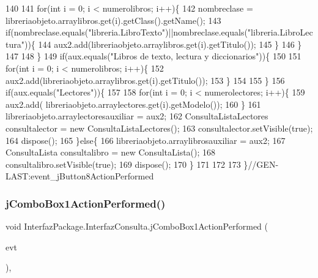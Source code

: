 \begin{DoxyCode}
140             
141             \textcolor{keywordflow}{for}(\textcolor{keywordtype}{int} i = 0; i < numerolibros; i++)\{
142                 nombreclase = libreriaobjeto.arraylibros.get(i).getClass().getName();
143                 \textcolor{keywordflow}{if}(nombreclase.equals(\textcolor{stringliteral}{"libreria.LibroTexto"})||nombreclase.equals(\textcolor{stringliteral}{"libreria.LibroLectura"}))\{
144                     aux2.add(libreriaobjeto.arraylibros.get(i).getTitulo());
145                 \}
146             \}
147             
148         \}
149         \textcolor{keywordflow}{if}(aux.equals(\textcolor{stringliteral}{"Libros de texto, lectura y diccionarios"}))\{
150             
151             \textcolor{keywordflow}{for}(\textcolor{keywordtype}{int} i = 0; i < numerolibros; i++)\{
152                 aux2.add(libreriaobjeto.arraylibros.get(i).getTitulo());
153             \}
154             
155         \}
156         \textcolor{keywordflow}{if}(aux.equals(\textcolor{stringliteral}{"Lectores"}))\{
157             
158             \textcolor{keywordflow}{for}(\textcolor{keywordtype}{int} i = 0; i < numerolectores; i++)\{
159             aux2.add( libreriaobjeto.arraylectores.get(i).getModelo());
160             \}
161             libreriaobjeto.arraylectoresauxiliar = aux2;
162             ConsultaListaLectores consultalector = \textcolor{keyword}{new} ConsultaListaLectores();
163             consultalector.setVisible(\textcolor{keyword}{true});
164             dispose();
165         \}\textcolor{keywordflow}{else}\{
166             libreriaobjeto.arraylibrosauxiliar = aux2;
167             ConsultaLista consultalibro = \textcolor{keyword}{new} ConsultaLista();
168             consultalibro.setVisible(\textcolor{keyword}{true});
169             dispose();
170         \}
171         
172         
173     \}\textcolor{comment}{//GEN-LAST:event\_jButton8ActionPerformed}
\end{DoxyCode}
\mbox{\label{class_interfaz_package_1_1_interfaz_consulta_a72feab888bad4cca4bf15c1186d400a1}} 
\subsubsection{\texorpdfstring{j\+Combo\+Box1\+Action\+Performed()}{jComboBox1ActionPerformed()}}
{\footnotesize\ttfamily void Interfaz\+Package.\+Interfaz\+Consulta.\+j\+Combo\+Box1\+Action\+Performed (\begin{DoxyParamCaption}\item[{java.\+awt.\+event.\+Action\+Event}]{evt }\end{DoxyParamCaption})\hspace{0.3cm}{\ttfamily [inline]}, {\ttfamily [private]}}



